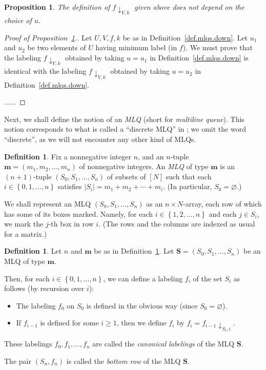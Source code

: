 \documentclass[reqno]{amsart}
\newcommand{\mm}{\mathbf{m}}
\newcommand{\MLQ}{\mathbf{S}}
\newcommand{\set}[1]{\left\{ #1 \right\}}
\newcommand{\abs}[1]{\left| #1 \right|}
\newcommand{\tup}[1]{\left( #1 \right)}
\newcommand{\ive}[1]{\left[ #1 \right]}
\newcommand{\defn}[1]{{\color{darkred}\emph{#1}}} %
\theoremstyle{plain}
\newtheorem{prop}[thm]{Proposition}
\theoremstyle{definition}
\newtheorem{dfn}[thm]{Definition}
\numberwithin{equation}{section}
\begin{document}
\begin{prop} \label{prop.mlqs.down.indep}
The definition of $f \downarrow_{V, k}$ given above does not
depend on the choice of $u$.
\end{prop}

\begin{proof}[Proof of Proposition~\ref{prop.mlqs.down.indep}.]
Let $U, V, f, k$ be as in Definition~\ref{def.mlqs.down}.
Let $u_1$ and $u_2$ be two elements of $U$ having minimum
label (in $f$).
We must prove that the labeling
$f \downarrow_{V, k}$ obtained by taking $u = u_1$ in
Definition~\ref{def.mlqs.down}
is identical with the labeling
$f \downarrow_{V, k}$ obtained by taking $u = u_2$ in
Definition~\ref{def.mlqs.down}.

......
\end{proof}

Next, we shall define the notion of an
\textit{MLQ} (short for \textit{multiline queue}).
This notion corresponds to what is called a
``discrete MLQ'' in \cite[\S 2.2]{AasLin17}; we omit the
word ``discrete'', as we will not encounter any other kind
of MLQs.

\begin{dfn} \label{def.mlqs.mlq}
Fix a nonnegative integer $n$,
and an $n$-tuple $\mm = \tup{m_1, m_2, \ldots, m_n}$ of nonnegative
integers.
An \defn{MLQ} of type $\mm$ is
an $\tup{n+1}$-tuple $\tup{S_0, S_1, \ldots, S_n}$ of subsets of
$\ive{N}$
such that each $i \in \set{0, 1, \ldots, n}$ satisfies
$\abs{S_i} = m_1 + m_2 + \cdots + m_i$.
(In particular, $S_0 = \varnothing$.)

We shall represent an MLQ $\tup{S_0, S_1, \ldots, S_n}$ as an
$n \times N$-array, each row of which has some of its boxes
marked. Namely, for each $i \in \set{1, 2, \ldots, n}$ and
each $j \in S_i$, we mark the $j$-th box in row $i$.
(The rows and the columns are indexed as usual for a matrix.)
\end{dfn}

\begin{dfn} \label{def.mlqs.can-lab}
Let $n$ and $\mm$ be as in Definition~\ref{def.mlqs.mlq}.
Let $\MLQ = \tup{S_0, S_1, \ldots, S_n}$ be an MLQ of type $\mm$.

Then, for each $i \in \set{0, 1, \ldots, n}$, we can
define a labeling $f_i$ of the set $S_i$ as follows (by
recursion over $i$):
\begin{itemize}
 \item The labeling $f_0$ on $S_0$ is defined in the
       obvious way (since $S_0 = \varnothing$).
 \item If $f_{i-1}$ is defined for some $i \geq 1$,
       then we define $f_i$ by
       $f_i = f_{i-1} \downarrow_{S_i, i}$.
\end{itemize}
These labelings $f_0, f_1, \ldots, f_n$ are called the
\defn{canonical labelings} of the MLQ $\MLQ$.

The pair $\tup{S_n, f_n}$ is called the
\defn{bottom row} of the MLQ $\MLQ$.
\end{dfn}
\end{document}
